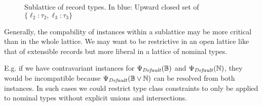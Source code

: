 \begin{figure}[ht]
  \centering
  \caption{Sublattice of record types. In {\color{blue}blue}: Upward closed set of $\{ \ell_2 : \tau_2, \ell_3 : \tau_3 \}$}
  \label{fig:upsets}
\end{figure}

Generally, the compability of instances within a sublattice may be more critical than in the whole lattice.
We may want to be restrictive in an open lattice like that of extensible records but more liberal in a lattice of nominal types.

E.g. if we have contravariant instances for $\Psi_\mathit{Default}(\mathbb{B})$ and $\Psi_\mathit{Default}(\mathbb{N})$, they would be incompatible because $\Psi_\mathit{Default}(\mathbb{B} \vee \mathbb{N})$ can be resolved from both instances.
In such cases we could restrict type class constraints to only be applied to nominal types without explicit unions and intersections.